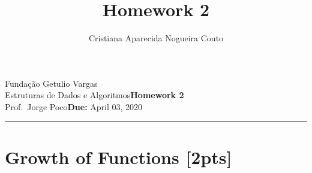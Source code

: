 \documentclass{article}
\title{Homework 2}
\date{}
\newcommand{\assignment}{Homework 2}
\newcommand{\duedate}{April 03, 2020}
\begin{document}
Fundação Getulio Vargas\hfill\\
Estruturas de Dados e Algoritmos\hfill\textbf{\assignment}\\
Prof.\ Jorge Poco\hfill\textbf{Due:} \duedate\\
\smallskip\hrule\bigskip
\author{Cristiana Aparecida Nogueira Couto}

{\let\newpage\relax\maketitle}
\maketitle

\section{Growth of Functions [2pts]}
\end{document}
